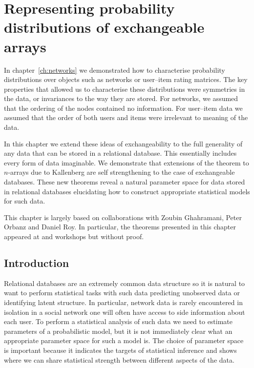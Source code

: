 
\inbpdocument

\chapter{Representing probability distributions of exchangeable arrays}
\label{ch:arrays}

In chapter~\ref{ch:networks} we demonstrated how to characterise probability distributions over objects such as networks or user--item rating matrices.
The key properties that allowed us to characterise these distributions were symmetries in the data, or invariances to the way they are stored.
For networks, we assumed that the ordering of the nodes contained no information.
For user--item data we assumed that the order of both users and items were irrelevant to meaning of the data.

In this chapter we extend these ideas of exchangeability to the full generality of any data that can be stored in a relational database.
This essentially includes every form of data imaginable.
We demonstrate that extensions of the  theorem to $n$-arrays due to Kallenberg are self strengthening to the case of exchangeable databases.
These new theorems reveal a natural parameter space for data stored in relational databases elucidating how to construct appropriate statistical models for such data.

This chapter is largely based on collaborations with Zoubin Ghahramani, Peter Orbanz and Daniel Roy.
In particular, the theorems presented in this chapter appeared at  and  workshops but without proof.

\section{Introduction}

Relational databases are an extremely common data structure so it is natural to want to perform statistical tasks with such data \eg predicting unobserved data or identifying latent structure.
In particular, network data is rarely encountered in isolation \eg in a social network one will often have access to side information about each user.
To perform a statistical analysis of such data we need to estimate parameters of a probabilistic model, but it is not immediately clear what an appropriate parameter space for such a model is.
The choice of parameter space is important because it indicates the targets of statistical inference and shows where we can share statistical strength between different aspects of the data.

